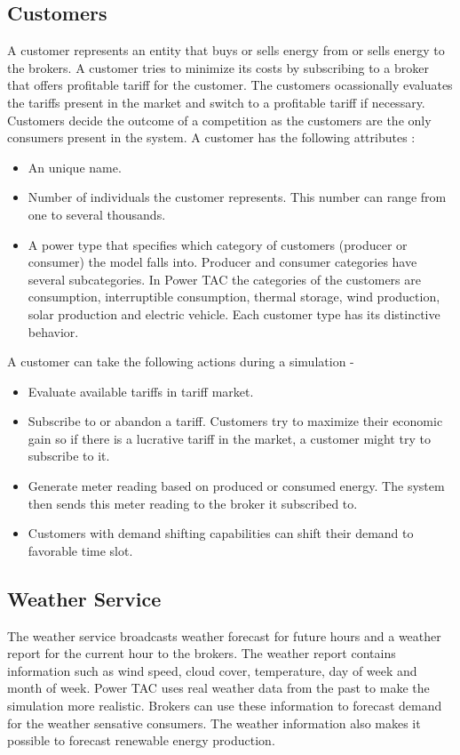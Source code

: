 \subsection{Customers}
A customer represents an entity that buys or sells energy from or sells energy to the brokers. A customer tries to minimize its costs by subscribing to a broker that offers profitable tariff for the customer. The customers ocassionally evaluates the tariffs present in the market and switch to a profitable tariff if necessary. Customers decide the outcome of a competition as the customers are the only consumers present in the system. A customer has the following attributes :
\begin{itemize}  
\item An unique name. 
\item Number of individuals the customer represents. This number can range from one to several thousands. 
\item A power type that specifies which category of customers (producer or consumer) the model falls into. Producer and consumer categories have several subcategories. In Power TAC the categories of the customers are consumption, interruptible consumption, thermal storage, wind production, solar production and electric vehicle. Each customer type has its distinctive behavior. 
\end{itemize}

A customer can take the following actions during a simulation - 
\begin{itemize}  
\item Evaluate available tariffs in tariff market.
\item Subscribe to or abandon a tariff. Customers try to maximize their economic gain so if there is a lucrative tariff in the market, a customer might try to subscribe to it.
\item Generate meter reading based on produced or consumed energy. The system then sends this meter reading to the broker it subscribed to. 
\item Customers with demand shifting capabilities can shift their demand to favorable time slot.
\end{itemize}
 

\subsection{Weather Service}
The weather service broadcasts weather forecast for future hours and a weather report for the current hour to the brokers. The weather report contains information such as wind speed, cloud cover, temperature, day of week and month of week. Power TAC uses real weather data from the past to make the simulation more realistic. Brokers can use these information to forecast demand for the weather sensative consumers. The weather information also makes it possible to forecast renewable energy production.

